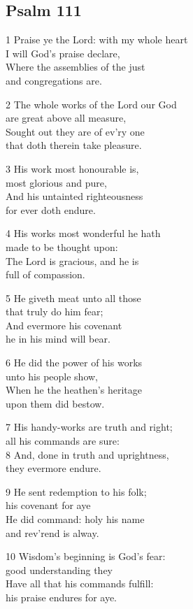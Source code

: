 \subsection*{Psalm 111}

1 Praise ye the Lord: with my whole heart\\
I will God’s praise declare,\\
Where the assemblies of the just\\
and congregations are.

2 The whole works of the Lord our God\\
are great above all measure,\\
Sought out they are of ev’ry one\\
that doth therein take pleasure.

3 His work most honourable is,\\
most glorious and pure,\\
And his untainted righteousness\\
for ever doth endure.

4 His works most wonderful he hath\\
made to be thought upon:\\
The Lord is gracious, and he is\\
full of compassion.

5 He giveth meat unto all those\\
that truly do him fear;\\
And evermore his covenant\\
he in his mind will bear.

6 He did the power of his works\\
unto his people show,\\
When he the heathen’s heritage\\
upon them did bestow.

7 His handy-works are truth and right;\\
all his commands are sure:\\
8 And, done in truth and uprightness,\\
they evermore endure.

9 He sent redemption to his folk;\\
his covenant for aye\\
He did command: holy his name\\
and rev’rend is alway.

10 Wisdom’s beginning is God’s fear:\\
good understanding they\\
Have all that his commands fulfill:\\
his praise endures for aye.

